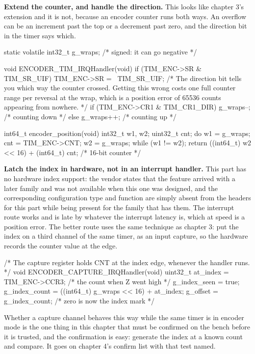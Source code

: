 \begin{steps}

\item \textbf{Extend the counter, and handle the direction.} This looks like
chapter 3's extension and it is not, because an encoder counter runs both ways.
An overflow can be an increment past the top or a decrement past zero, and the
direction bit in the timer says which.
\begin{ccode}
static volatile int32_t g_wraps;          /* signed: it can go negative */

void ENCODER_TIM_IRQHandler(void)
{
    if (TIM_ENC->SR & TIM_SR_UIF) {
        TIM_ENC->SR = ~TIM_SR_UIF;
        /* The direction bit tells you which way the counter crossed. Getting
           this wrong costs one full counter range per reversal at the wrap,
           which is a position error of 65536 counts appearing from nowhere. */
        if (TIM_ENC->CR1 & TIM_CR1_DIR) g_wraps--;   /* counting down */
        else                            g_wraps++;   /* counting up   */
    }
}

int64_t encoder_position(void)
{
    int32_t w1, w2; uint32_t cnt;
    do { w1 = g_wraps; cnt = TIM_ENC->CNT; w2 = g_wraps; } while (w1 != w2);
    return ((int64_t) w2 << 16) + (int64_t) cnt;     /* 16-bit counter */
}
\end{ccode}

\item \textbf{Latch the index in hardware, not in an interrupt handler.} This
part has no hardware index support: the vendor states that the feature arrived
with a later family and was not available when this one was designed, and the
corresponding configuration type and function are simply absent from the headers
for this part while being present for the family that has them. The interrupt
route works and is late by whatever the interrupt latency is, which at speed is
a position error. The better route uses the same technique as chapter 3: put the
index on a third channel of the same timer, as an input capture, so the hardware
records the counter value at the edge.
\begin{ccode}
/* The capture register holds CNT at the index edge, whenever the handler runs. */
void ENCODER_CAPTURE_IRQHandler(void)
{
    uint32_t at_index = TIM_ENC->CCR3;        /* the count when Z went high */
    g_index_seen = true;
    g_index_count = ((int64_t) g_wraps << 16) + at_index;
    g_offset = g_index_count;                 /* zero is now the index mark */
}
\end{ccode}
Whether a capture channel behaves this way while the same timer is in encoder
mode is the one thing in this chapter that must be confirmed on the bench before
it is trusted, and the confirmation is easy: generate the index at a known
count and compare. It goes on chapter 4's confirm list with that test named.


\end{steps}
